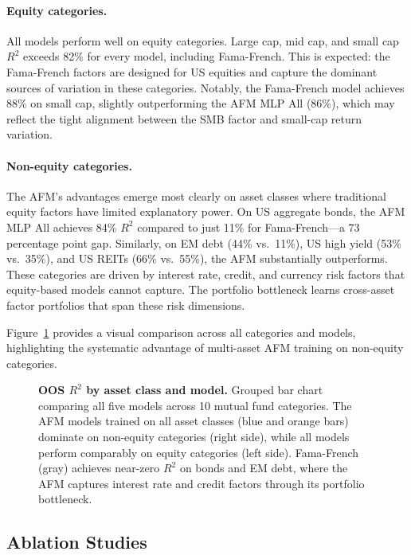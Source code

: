 \paragraph{Equity categories.} All models perform well on equity categories. Large cap, mid cap, and small cap $R^2$ exceeds 82\% for every model, including Fama-French. This is expected: the Fama-French factors are designed for US equities and capture the dominant sources of variation in these categories. Notably, the Fama-French model achieves 88\% on small cap, slightly outperforming the AFM MLP All (86\%), which may reflect the tight alignment between the SMB factor and small-cap return variation.

\paragraph{Non-equity categories.} The AFM's advantages emerge most clearly on asset classes where traditional equity factors have limited explanatory power. On US aggregate bonds, the AFM MLP All achieves 84\% $R^2$ compared to just 11\% for Fama-French---a 73 percentage point gap. Similarly, on EM debt (44\% vs.\ 11\%), US high yield (53\% vs.\ 35\%), and US REITs (66\% vs.\ 55\%), the AFM substantially outperforms. These categories are driven by interest rate, credit, and currency risk factors that equity-based models cannot capture. The portfolio bottleneck learns cross-asset factor portfolios that span these risk dimensions.

Figure~\ref{fig:r2_comparison} provides a visual comparison across all categories and models, highlighting the systematic advantage of multi-asset AFM training on non-equity categories.

\begin{figure}[t]
\centering
\fbox{\rule{0pt}{2in}\rule{0.9\linewidth}{0pt}} %
\caption{\textbf{OOS $R^2$ by asset class and model.} Grouped bar chart comparing all five models across 10 mutual fund categories. The AFM models trained on all asset classes (blue and orange bars) dominate on non-equity categories (right side), while all models perform comparably on equity categories (left side). Fama-French (gray) achieves near-zero $R^2$ on bonds and EM debt, where the AFM captures interest rate and credit factors through its portfolio bottleneck.}
\label{fig:r2_comparison}
\end{figure}

\subsection{Ablation Studies}\label{sec:ablation}

